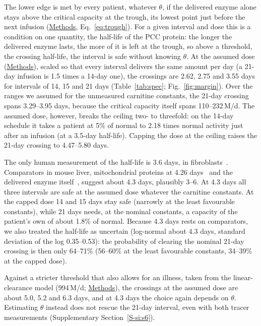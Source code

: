 \documentclass[11pt]{article}
\newcommand{\um}{\,\textmu M/d}
\begin{document}
The lower edge is met by every patient, whatever $\theta$, if the delivered enzyme alone stays
above the critical capacity at the trough, its lowest point just before the next infusion
(\hyperref[sec:trough]{Methods}, Eq.~\eqref{eq:trough}). For a given interval and dose this is a condition on one
quantity, the half-life of the PCC protein: the longer the delivered enzyme lasts, the more of it
is left at the trough, so above a threshold, the crossing half-life, the interval is safe without
knowing $\theta$. At the assumed dose (\hyperref[sec:model]{Methods}), scaled so that every interval delivers the same
amount per day (a 21-day infusion is 1.5 times a 14-day one), the crossings are 2.62, 2.75 and 3.55
days for intervals of 14, 15 and 21 days (Table~\ref{tab:spec}; Fig.~\ref{fig:margin}). Over the
ranges we assumed for the unmeasured carnitine constants, the 21-day crossing spans 3.29--3.95
days, because the critical capacity itself spans 110--232\um. The assumed dose, however, breaks
the ceiling two- to threefold: on the 14-day schedule it takes a patient at 5\% of normal to 2.18
times normal activity just after an infusion (at a 3.5-day half-life). Capping the dose at the
ceiling raises the 21-day crossing to 4.47--5.80 days.

The only human measurement of the half-life is 3.6 days, in fibroblasts~\cite{chandler1985}.
Comparators in mouse liver, mitochondrial proteins at 4.26 days~\cite{kim2012} and the delivered
enzyme itself~\cite{pkpd_translational,jiang2020dual}, suggest about 4.3 days, plausibly 3--6. At
4.3 days all three intervals are safe at the assumed dose whatever the carnitine constants. At the
capped dose 14 and 15 days stay safe (narrowly at the least favourable constants), while 21 days
needs, at the nominal constants, a capacity of the patient's own of about 1.8\% of normal. Because
4.3 days rests on comparators, we also treated the half-life as uncertain (log-normal about 4.3
days, standard deviation of the log 0.35--0.53): the probability of clearing the nominal 21-day
crossing is then only 64--71\% (56--60\% at the least favourable constants, 34--39\% at the capped
dose).

Against a stricter threshold that also allows for an illness, taken from
the linear-clearance model (994\um; \hyperref[sec:trough]{Methods}), the crossings at the assumed dose are about 5.0, 5.2
and 6.3 days, and at 4.3 days the choice again depends on $\theta$. Estimating $\theta$ instead does not rescue the 21-day interval, even with both tracer
measurements (Supplementary Section~\ref{S-si:s6}).
\end{document}
